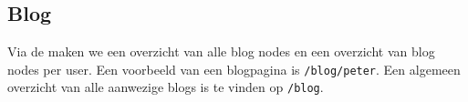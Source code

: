 \subsection{Blog}\label{blog}

Via de  maken we een overzicht van alle blog nodes en een overzicht van blog nodes per user. Een voorbeeld van een blogpagina is \texttt{/blog/peter}. Een algemeen overzicht van alle aanwezige blogs is te vinden op \texttt{/blog}. 